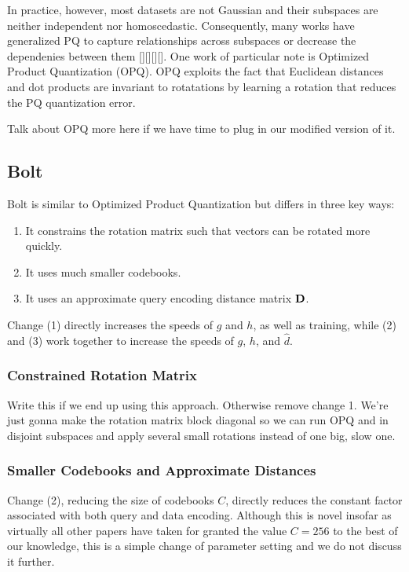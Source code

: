 In practice, however, most datasets are not Gaussian and their subspaces are neither independent nor homoscedastic. Consequently, many works have generalized PQ to capture relationships across subspaces or decrease the dependenies between them [][][][]. One work of particular note is Optimized Product Quantization (OPQ). OPQ exploits the fact that Euclidean distances and dot products are invariant to rotatations by learning a rotation that reduces the PQ quantization error.

Talk about OPQ more here if we have time to plug in our modified version of it.

\subsection{Bolt}

Bolt is similar to Optimized Product Quantization but differs in three key ways:
\begin{enumerate}
\item It constrains the rotation matrix such that vectors can be rotated more quickly.
\item It uses much smaller codebooks.
\item It uses an approximate query encoding distance matrix $\mathbf{D}$.
\end{enumerate}

Change (1) directly increases the speeds of $g$ and $h$, as well as training, while (2) and (3) work together to increase the speeds of $g$, $h$, and $\hat{d}$.

\subsubsection{Constrained Rotation Matrix}

Write this if we end up using this approach. Otherwise remove change 1. We're just gonna make the rotation matrix block diagonal so we can run OPQ and in disjoint subspaces and apply several small rotations instead of one big, slow one.

\subsubsection{Smaller Codebooks and Approximate Distances} \label{sec:boltVectorize}

Change (2), reducing the size of codebooks $C$, directly reduces the constant factor associated with both query and data encoding. Although this is novel insofar as virtually all other papers have taken for granted the value $C = 256$ to the best of our knowledge, this is a simple change of parameter setting and we do not discuss it further.

